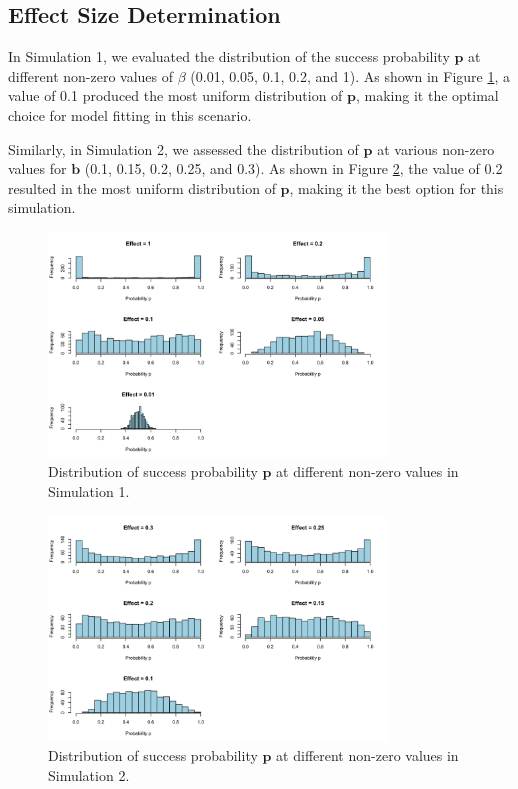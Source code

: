 \documentclass[12pt]{article}
\begin{document}
\subsection{Effect Size Determination}

In Simulation 1, we evaluated the distribution of the success probability \( \mathbf{p} \) at different non-zero values of \( \beta \) (0.01, 0.05, 0.1, 0.2, and 1). As shown in Figure \ref{fig:sim1_p_dist}, a value of 0.1 produced the most uniform distribution of \( \mathbf{p} \), making it the optimal choice for model fitting in this scenario.

Similarly, in Simulation 2, we assessed the distribution of \( \mathbf{p} \) at various non-zero values for \( \mathbf{b} \) (0.1, 0.15, 0.2, 0.25, and 0.3). As shown in Figure \ref{fig:sim2_p_dist}, the value of 0.2 resulted in the most uniform distribution of \( \mathbf{p} \), making it the best option for this simulation.

\begin{figure}[H]
	\centering
	\includegraphics[width=0.8\textwidth]{sim1_p_dist.png}
  \caption{Distribution of success probability \( \mathbf{p} \) at different non-zero values in Simulation 1.}
	\label{fig:sim1_p_dist}
\end{figure}

\begin{figure}[H]
	\centering
	\includegraphics[width=0.8\textwidth]{sim2_p_dist.png}
  \caption{Distribution of success probability \( \mathbf{p} \) at different non-zero values in Simulation 2.}
	\label{fig:sim2_p_dist}
\end{figure}
\end{document}
